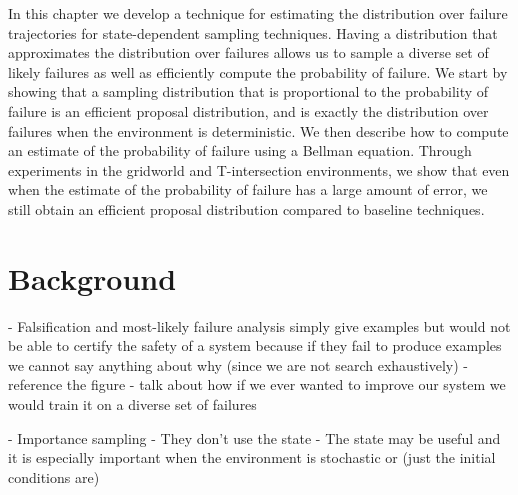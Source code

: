 In this chapter we develop a technique for estimating the distribution over failure trajectories for state-dependent sampling techniques. Having a distribution that approximates the distribution over failures allows us to sample a diverse set of likely failures as well as efficiently compute the probability of failure. We start by showing that a sampling distribution that is proportional to the probability of failure is an efficient proposal distribution, and is exactly the distribution over failures when the environment is deterministic. We then describe how to compute an estimate of the probability of failure using a Bellman equation. Through experiments in the gridworld and T-intersection environments, we show that even when the estimate of the probability of failure has a large amount of error, we still obtain an efficient proposal distribution compared to baseline techniques.

\section{Background}

- Falsification and most-likely failure analysis simply give examples but would not be able to certify the safety of a system because if they fail to produce examples we cannot say anything about why (since we are not search exhaustively)
-reference the figure
- talk about how if we ever wanted to improve our system we would train it on a diverse set of failures




- Importance sampling
- They don't use the state
- The state may be useful and it is especially important when the environment is stochastic or (just the initial conditions are)




